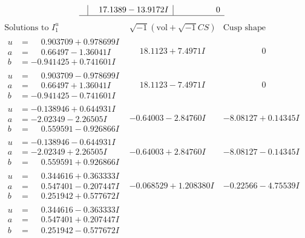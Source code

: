 \documentclass[1p]{elsarticle_modified}
\theoremstyle{definition}
\newcommand{\I}{\sqrt{-1}}
\begin{document}
$$\begin{array}{c|c|c}
 & \phantom{-}17.1389 - 13.9172 I & \phantom{-0.000000 } 0\\
 \hline 
 \end{array}$$\newpage$$\begin{array}{c|c|c}  
\text{Solutions to }I^u_{1}& \I (\text{vol} + \sqrt{-1}CS) & \text{Cusp shape}\\
 \hline 
\begin{aligned}
u &= \phantom{-}0.903709 + 0.978699 I \\
a &= \phantom{-}0.66497 - 1.36041 I \\
b &= -0.941425 + 0.741601 I\end{aligned}
 & \phantom{-}18.1123 + 7.4971 I & \phantom{-0.000000 } 0 \\ \hline\begin{aligned}
u &= \phantom{-}0.903709 - 0.978699 I \\
a &= \phantom{-}0.66497 + 1.36041 I \\
b &= -0.941425 - 0.741601 I\end{aligned}
 & \phantom{-}18.1123 - 7.4971 I & \phantom{-0.000000 } 0 \\ \hline\begin{aligned}
u &= -0.138946 + 0.644931 I \\
a &= -2.02349 - 2.26505 I \\
b &= \phantom{-}0.559591 - 0.926866 I\end{aligned}
 & -0.64003 - 2.84760 I & -8.08127 + 0.14345 I \\ \hline\begin{aligned}
u &= -0.138946 - 0.644931 I \\
a &= -2.02349 + 2.26505 I \\
b &= \phantom{-}0.559591 + 0.926866 I\end{aligned}
 & -0.64003 + 2.84760 I & -8.08127 - 0.14345 I \\ \hline\begin{aligned}
u &= \phantom{-}0.344616 + 0.363333 I \\
a &= \phantom{-}0.547401 - 0.207447 I \\
b &= \phantom{-}0.251942 + 0.577672 I\end{aligned}
 & -0.068529 + 1.208380 I & -0.22566 - 4.75539 I \\ \hline\begin{aligned}
u &= \phantom{-}0.344616 - 0.363333 I \\
a &= \phantom{-}0.547401 + 0.207447 I \\
b &= \phantom{-}0.251942 - 0.577672 I\end{aligned}

\end{array}$$
\end{document}
